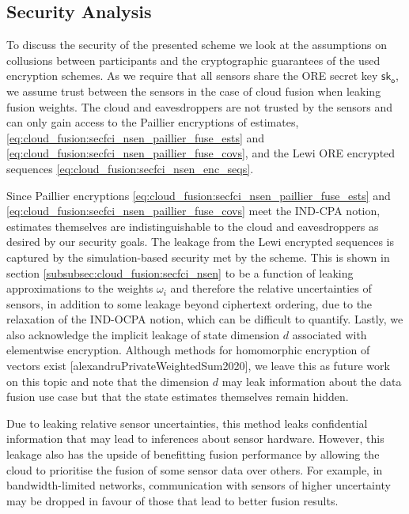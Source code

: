 % 
% 

\subsection{Security Analysis}\label{subsec:cloud_fusion:secfci_security}
To discuss the security of the presented scheme we look at the assumptions on collusions between participants and the cryptographic guarantees of the used encryption schemes. As we require that all sensors share the ORE secret key $\mathsf{sk}_{\mathsf{o}}$, we assume trust between the sensors in the case of cloud fusion when leaking fusion weights. The cloud and eavesdroppers are not trusted by the sensors and can only gain access to the Paillier encryptions of estimates, \eqref{eq:cloud_fusion:secfci_nsen_paillier_fuse_ests} and \eqref{eq:cloud_fusion:secfci_nsen_paillier_fuse_covs}, and the Lewi ORE encrypted sequences \eqref{eq:cloud_fusion:secfci_nsen_enc_seqs}.

Since Paillier encryptions \eqref{eq:cloud_fusion:secfci_nsen_paillier_fuse_ests} and \eqref{eq:cloud_fusion:secfci_nsen_paillier_fuse_covs} meet the IND-CPA notion, estimates themselves are indistinguishable to the cloud and eavesdroppers as desired by our security goals. The leakage from the Lewi encrypted sequences is captured by the simulation-based security met by the scheme. This is shown in section \ref{subsubsec:cloud_fusion:secfci_nsen} to be a function of leaking approximations to the weights $\omega_i$ and therefore the relative uncertainties of sensors, in addition to some leakage beyond ciphertext ordering, due to the relaxation of the IND-OCPA notion, which can be difficult to quantify. Lastly, we also acknowledge the implicit leakage of state dimension $d$ associated with elementwise encryption. Although methods for homomorphic encryption of vectors exist [alexandruPrivateWeightedSum2020], we leave this as future work on this topic and note that the dimension $d$ may leak information about the data fusion use case but that the state estimates themselves remain hidden.

Due to leaking relative sensor uncertainties, this method leaks confidential information that may lead to inferences about sensor hardware. However, this leakage also has the upside of benefitting fusion performance by allowing the cloud to prioritise the fusion of some sensor data over others. For example, in bandwidth-limited networks, communication with sensors of higher uncertainty may be dropped in favour of those that lead to better fusion results.

